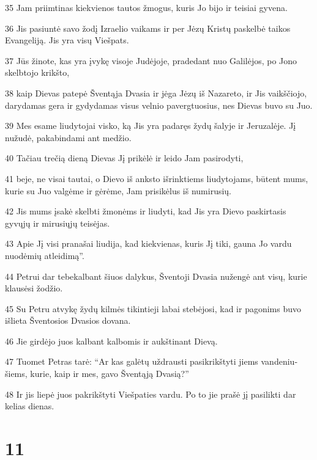 \par 35 Jam priimtinas kiekvienos tautos žmogus, kuris Jo bijo ir teisiai gyvena. 
\par 36 Jis pasiuntė savo žodį Izraelio vaikams ir per Jėzų Kristų paskelbė taikos Evangeliją. Jis yra visų Viešpats. 
\par 37 Jūs žinote, kas yra įvykę visoje Judėjoje, pradedant nuo Galilėjos, po Jono skelbtojo krikšto,­ 
\par 38 kaip Dievas patepė Šventąja Dvasia ir jėga Jėzų iš Nazareto, ir Jis vaikščiojo, darydamas gera ir gydydamas visus velnio pavergtuosius, nes Dievas buvo su Juo. 
\par 39 Mes esame liudytojai visko, ką Jis yra padaręs žydų šalyje ir Jeruzalėje. Jį nužudė, pakabindami ant medžio. 
\par 40 Tačiau trečią dieną Dievas Jį prikėlė ir leido Jam pasirodyti, 
\par 41 beje, ne visai tautai, o Dievo iš anksto išrinktiems liudytojams, būtent mums, kurie su Juo valgėme ir gėrėme, Jam prisikėlus iš numirusių. 
\par 42 Jis mums įsakė skelbti žmonėms ir liudyti, kad Jis yra Dievo paskirtasis gyvųjų ir mirusiųjų teisėjas. 
\par 43 Apie Jį visi pranašai liudija, kad kiekvienas, kuris Jį tiki, gauna Jo vardu nuodėmių atleidimą”. 
\par 44 Petrui dar tebekalbant šiuos dalykus, Šventoji Dvasia nužengė ant visų, kurie klausėsi žodžio. 
\par 45 Su Petru atvykę žydų kilmės tikintieji labai stebėjosi, kad ir pagonims buvo išlieta Šventosios Dvasios dovana. 
\par 46 Jie girdėjo juos kalbant kalbomis ir aukštinant Dievą. 
\par 47 Tuomet Petras tarė: “Ar kas galėtų uždrausti pasikrikštyti jiems vandeniu­šiems, kurie, kaip ir mes, gavo Šventąją Dvasią?” 
\par 48 Ir jis liepė juos pakrikštyti Viešpaties vardu. Po to jie prašė jį pasilikti dar kelias dienas.


\chapter{11}


